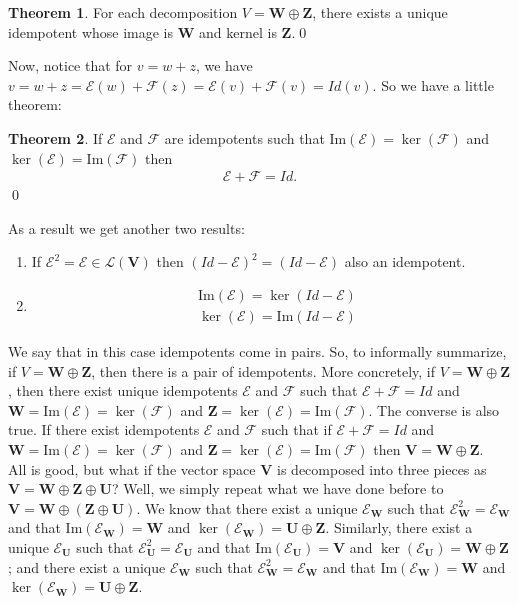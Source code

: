 \documentclass{book}
\theoremstyle{definition}
\newtheorem{thm}{Theorem}[section]
\newcommand{\F}{\mathcal{F}}
\newcommand{\V}{\mathbf{V}}
\newcommand{\W}{\mathbf{W}}
\newcommand{\Z}{\mathbf{Z}}
\newcommand{\U}{\mathbf{U}}
\newcommand{\lag}{\mathcal{L}}
\newcommand{\E}{\mathcal{E}}
\newcommand{\ima}{\text{Im}}
\begin{document}
\begin{thm}
	For each decomposition $V = \W \oplus \Z$, there exists a unique idempotent whose image is $\W$ and kernel is $\Z$.\qed
\end{thm}

Now, notice that for $v = w + z$, we have $v = w + z = \E(w) + \F(z) = \E(v) + \F(v) = Id(v)$. So we have a little theorem:

\begin{thm}
	If $\E$ and $\F$ are idempotents such that $\ima(\E) = \ker(\F)$ and $\ker(\E) = \ima(\F)$ then
	\begin{align*}
	\E + \F = Id. 
	\end{align*}\qed
\end{thm} 

As a result we get another two results:

	\begin{enumerate}
		\item If $\E^2 = \E \in \lag(\V)$ then $(Id - \E)^2 = (Id - \E)$ also an idempotent.
		
		\item 
		\begin{align*}
		&\ima(\E) = \ker(Id - \E)\\
		&\ker(\E) = \ima(Id - \E)
		\end{align*}
	\end{enumerate}

We say that in this case idempotents come in pairs. So, to informally summarize, if $V = \W \oplus \Z$, then there is a pair of idempotents. More concretely, if $V = \W \oplus \Z$, then there exist unique idempotents $\E$ and $\F$ such that $\E + \F = Id$ and $\W = \ima(\E) = \ker(\F)$ and $\Z = \ker(\E) = \ima(\F)$. The converse is also true. If there exist idempotents $\E$ and $\F$ such that if $\E + \F = Id$ and $\W = \ima(\E) = \ker(\F)$ and $\Z = \ker(\E) = \ima(\F)$ then $\V = \W \oplus \Z$.\\

All is good, but what if the vector space $\V$ is decomposed into three pieces as $\V = \W \oplus \Z \oplus \U$? Well, we simply repeat what we have done before to $\V = \W \oplus (\Z \oplus \U)$. We know that there exist a unique $\E_\W$ such that $\E_\W^2 = \E_\W$ and that $\ima(\E_\W) = \W$ and $\ker(\E_\W) = \U\oplus \Z$. Similarly,  there exist a unique $\E_\U$ such that $\E_\U^2 = \E_\U$ and that $\ima(\E_\U) = \V$ and $\ker(\E_\U) = \W\oplus \Z$; and there exist a unique $\E_\W$ such that $\E_\W^2 = \E_\W$ and that $\ima(\E_\W) = \W$ and $\ker(\E_\W) = \U\oplus \Z$.\\
\end{document}
